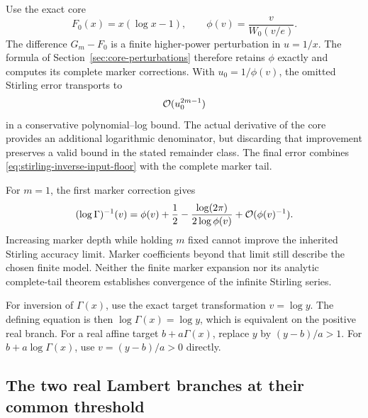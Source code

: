 Use the exact core
\begin{equation}
 F_0(x)=x(\log x-1),\qquad
 \phi(v)=\frac{v}{W_0(v/e)}.
 \label{eq:stirling-exact-core}
\end{equation}
The difference $G_m-F_0$ is a finite higher-power perturbation in
$u=1/x$. The formula of Section~\ref{sec:core-perturbations} therefore
retains $\phi$ exactly and computes its complete marker corrections.
With $u_0=1/\phi(v)$, the omitted Stirling error transports to
\begin{equation}
 \mathcal O(u_0^{2m-1})
 \label{eq:stirling-inverse-input-floor}
\end{equation}
in a conservative polynomial--log bound. The actual
derivative of the core provides an additional logarithmic denominator,
but discarding that improvement preserves a valid bound in the stated
remainder class. The final error combines
\eqref{eq:stirling-inverse-input-floor} with the complete marker tail.

For $m=1$, the first marker correction gives
\begin{equation}
 (\log\Gamma)^{-1}(v)
 =\phi(v)+\frac12-\frac{\log(2\pi)}{2\log\phi(v)}
 +\mathcal O(\phi(v)^{-1}).
 \label{eq:stirling-first-corrected-inverse}
\end{equation}
Increasing marker depth while holding $m$ fixed cannot improve the inherited
Stirling accuracy limit. Marker coefficients beyond that limit still
describe the chosen finite model. Neither the finite marker expansion nor its analytic
complete-tail theorem establishes convergence of the infinite Stirling
series.

For inversion of $\Gamma(x)$, use the exact target transformation
$v=\log y$. The defining equation is then
$\log\Gamma(x)=\log y$, which is equivalent on the positive real branch.
For a real affine target $b+a\Gamma(x)$, replace $y$ by $(y-b)/a>1$.
For $b+a\log\Gamma(x)$, use $v=(y-b)/a>0$ directly.

\subsection{The two real Lambert branches at their common threshold}

